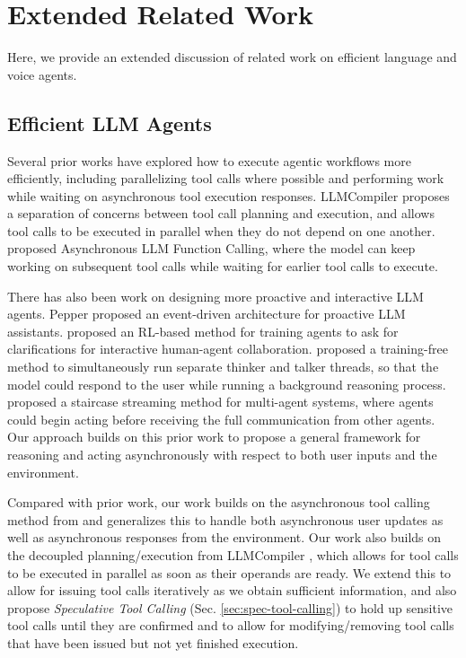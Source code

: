 \newpage
\section{Extended Related Work}

\label{sec:appendix_related_work}

Here, we provide an extended discussion of related work on efficient language and voice agents.

\subsection{Efficient LLM Agents}

Several prior works have explored how to execute agentic workflows more efficiently, including parallelizing tool calls where possible and performing work while waiting on asynchronous tool execution responses.
LLMCompiler \citep{kim2024llm} proposes a separation of concerns between tool call planning and execution, and allows tool calls to be executed in parallel when they do not depend on one another.
\citep{gim2024asynchronous} proposed Asynchronous LLM Function Calling, where the model can keep working on subsequent tool calls while waiting for earlier tool calls to execute.

There has also been work on designing more proactive and interactive LLM agents.
Pepper \citep{rllm2025pepper} proposed an event-driven architecture for proactive LLM assistants.
\citep{acikgoz2025speakrl} proposed an RL-based method for training agents to ask for clarifications for interactive human-agent collaboration. 
\citep{yakushev2025asynchronous} proposed a training-free method to simultaneously run separate thinker and talker threads, so that the model could respond to the user while running a background reasoning process.
\citep{wang2025staircase} proposed a staircase streaming method for multi-agent systems, where agents could begin acting before receiving the full communication from other agents.
Our approach builds on this prior work to propose a general framework for reasoning and acting asynchronously with respect to both user inputs and the environment.

Compared with prior work, our work builds on the asynchronous tool calling method from \citep{gim2024asynchronous} and generalizes this to handle both asynchronous user updates as well as asynchronous responses from the environment.
Our work also builds on the decoupled planning/execution from LLMCompiler \citep{kim2024llm}, which allows for tool calls to be executed in parallel as soon as their operands are ready.
We extend this to allow for issuing tool calls iteratively as we obtain sufficient information, and also propose \textit{Speculative Tool Calling} (Sec. \ref{sec:spec-tool-calling}) to hold up sensitive tool calls until they are confirmed and to allow for modifying/removing tool calls that have been issued but not yet finished execution.


